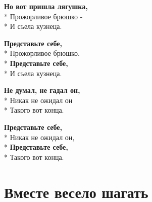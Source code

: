 \medskip

\begin{minipage}{\linewidth}
\textbf{Но вот пришла лягушка,}\\*
Прожорливое брюшко -\\*
И съела кузнеца.\\
\end{minipage}\par\medskip\nobreak

\medskip

\begin{minipage}{\linewidth}
\hspace*{1.5em}\textbf{Представьте себе,}\\*
\hspace*{1.5em}Прожорливое брюшко.\\*
\hspace*{1.5em}\textbf{Представьте себе,}\\*
\hspace*{1.5em}И съела кузнеца.\\
\end{minipage}\par\medskip\nobreak

\medskip

\begin{minipage}{\linewidth}
\textbf{Не думал, не гадал он,}\\*
Никак не ожидал он\\*
Такого вот конца.\\
\end{minipage}\par\medskip\nobreak

\medskip

\begin{minipage}{\linewidth}
\hspace*{1.5em}\textbf{Представьте себе,}\\*
\hspace*{1.5em}Никак не ожидал он,\\*
\hspace*{1.5em}\textbf{Представьте себе,}\\*
\hspace*{1.5em}Такого вот конца.\\
\end{minipage}

\vspace{\fill}\newpage

\section{Вместе весело шагать}
\label{song:Вместе_весело_шагать}


